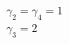 \documentclass[preview]{standalone}
\begin{document}
\begin{center}
$\gamma_2 = \gamma_4 = 1$\\$\gamma_3 = 2$
\end{center}
\end{document}
